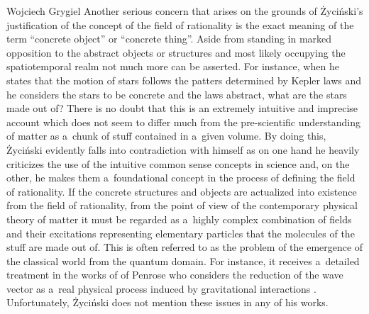 \begin{artengenv}{Wojciech Grygiel}
Another serious concern that arises on the grounds of Życiński's justification of the concept of the field of rationality is the exact meaning of the term ``concrete object'' or ``concrete thing''. Aside from standing in marked opposition to the abstract objects or structures and most likely occupying the spatiotemporal realm not much more can be asserted. For instance, when he states that the motion of stars follows the patters determined by Kepler laws and he considers the stars to be concrete and the laws abstract, what are the stars made out of? There is no doubt that this is an extremely intuitive and imprecise account which does not seem to differ much from the pre-scientific understanding of matter as a~chunk of stuff contained in a~given volume. By doing this, Życiński evidently falls into contradiction with himself as on one hand he heavily criticizes the use of the intuitive common sense concepts in science and, on the other, he makes them a~foundational concept in the process of defining the field of rationality. If the concrete structures and objects are actualized into existence from the field of rationality, from the point of view of the contemporary physical theory of matter it must be regarded as a~highly complex combination of fields and their excitations representing elementary particles that the molecules of the stuff are made out of. This is often referred to as the problem of the emergence of the classical world from the quantum domain. For instance, it receives a~detailed treatment in the works of of Penrose who considers the reduction of the wave vector as a~real physical process induced by gravitational interactions
\parencite[e.g.][pp.816–868]{penrose_road_2005}. %
 Unfortunately, Życiński does not mention these issues in any of his works.


\end{artengenv}
